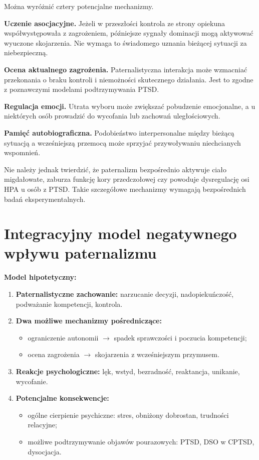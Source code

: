 \documentclass[11pt,a4paper,oneside,headinclude=true,footinclude=false]{scrartcl}
\providecommand{\tightlist}{\setlength{\itemsep}{3pt}\setlength{\parskip}{0pt}}
\begin{document}
Można wyróżnić cztery potencjalne mechanizmy.

\textbf{Uczenie asocjacyjne.} Jeżeli w przeszłości kontrola ze strony
opiekuna współwystępowała z zagrożeniem, późniejsze sygnały dominacji
mogą aktywować wyuczone skojarzenia. Nie wymaga to świadomego uznania
bieżącej sytuacji za niebezpieczną.

\textbf{Ocena aktualnego zagrożenia.} Paternalistyczna interakcja może
wzmacniać przekonania o braku kontroli i niemożności skutecznego
działania. Jest to zgodne z poznawczymi modelami podtrzymywania PTSD.

\textbf{Regulacja emocji.} Utrata wyboru może zwiększać pobudzenie
emocjonalne, a u niektórych osób prowadzić do wycofania lub zachowań
uległościowych.

\textbf{Pamięć autobiograficzna.} Podobieństwo interpersonalne między
bieżącą sytuacją a wcześniejszą przemocą może sprzyjać przywoływaniu
niechcianych wspomnień.

Nie należy jednak twierdzić, że paternalizm bezpośrednio aktywuje ciało
migdałowate, zaburza funkcję kory przedczołowej czy powoduje
dysregulację osi HPA u osób z PTSD. Takie szczegółowe mechanizmy
wymagają bezpośrednich badań eksperymentalnych.

\section{Integracyjny model negatywnego wpływu paternalizmu}\label{sec:7}

\textbf{Model hipotetyczny:}

\begin{enumerate}
\def\labelenumi{\arabic{enumi}.}
\tightlist
\item
  \textbf{Paternalistyczne zachowanie:} narzucanie decyzji,
  nadopiekuńczość, podważanie kompetencji, kontrola.
\item
  \textbf{Dwa możliwe mechanizmy pośredniczące:}

  \begin{itemize}
  \tightlist
  \item
    ograniczenie autonomii \(\rightarrow\) spadek sprawczości i poczucia
    kompetencji;\\
  \item
    ocena zagrożenia \(\rightarrow\) skojarzenia z wcześniejszym przymusem.\\
  \end{itemize}
\item
  \textbf{Reakcje psychologiczne:} lęk, wstyd, bezradność, reaktancja,
  unikanie, wycofanie.
\item
  \textbf{Potencjalne konsekwencje:}

  \begin{itemize}
  \tightlist
  \item
    ogólne cierpienie psychiczne: stres, obniżony dobrostan, trudności
    relacyjne;\\
  \item
    możliwe podtrzymywanie objawów pourazowych: PTSD, DSO w CPTSD,
    dysocjacja.
  \end{itemize}
\end{enumerate}
\end{document}
